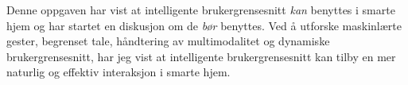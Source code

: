 Denne oppgaven har vist at intelligente brukergrensesnitt \emph{kan} benyttes i smarte hjem og har startet en diskusjon om de \emph{bør} benyttes. Ved å utforske maskinlærte gester, begrenset tale, håndtering av multimodalitet og dynamiske brukergrensesnitt, har jeg vist at intelligente brukergrensesnitt kan tilby en mer naturlig og effektiv interaksjon i smarte hjem. 


